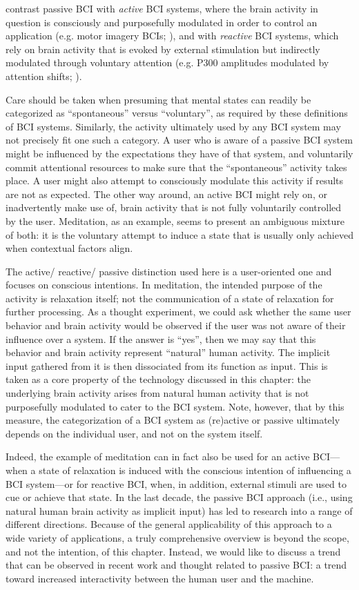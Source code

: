  contrast passive BCI with \emph{active} BCI systems, where the brain activity in question is consciously and purposefully modulated in order to control an application (e.g. motor imagery BCIs; ), and with \emph{reactive} BCI systems, which rely on brain activity that is evoked by external stimulation but indirectly modulated through voluntary attention (e.g. P300 amplitudes modulated by attention shifts; ).

Care should be taken when presuming that mental states can readily be categorized as ``spontaneous'' versus ``voluntary'', as required by these definitions of BCI systems. Similarly, the activity ultimately used by any BCI system may not precisely fit one such a category. A user who is aware of a passive BCI system might be influenced by the expectations they have of that system, and voluntarily commit attentional resources to make sure that the ``spontaneous'' activity takes place. A user might also attempt to consciously modulate this activity if results are not as expected. The other way around, an active BCI might rely on, or inadvertently make use of, brain activity that is not fully voluntarily controlled by the user. Meditation, as an example, seems to present an ambiguous mixture of both: it is the voluntary attempt to induce a state that is usually only achieved when contextual factors align.

The active/ reactive/ passive distinction used here is a user-oriented one and focuses on conscious intentions. In meditation, the intended purpose of the activity is relaxation itself; not the communication of a state of relaxation for further processing. As a thought experiment, we could ask whether the same user behavior and brain activity would be observed if the user was not aware of their influence over a system. If the answer is ``yes'', then we may say that this behavior and brain activity represent ``natural'' human activity. The implicit input gathered from it is then dissociated from its function as input. This is taken as a core property of the technology discussed in this chapter: the underlying brain activity arises from natural human activity that is not purposefully modulated to cater to the BCI system. Note, however, that by this measure, the categorization of a BCI system as (re)active or passive ultimately depends on the individual user, and not on the system itself.

Indeed, the example of meditation can in fact also be used for an active BCI---when a state of relaxation is induced with the conscious intention of influencing a BCI system---or for reactive BCI, when, in addition, external stimuli are used to cue or achieve that state.
In the last decade, the passive BCI approach (i.e., using natural human brain activity as implicit input) has led to research into a range of different directions. Because of the general applicability of this approach to a wide variety of applications, a truly comprehensive overview is beyond the scope, and not the intention, of this chapter. Instead, we would like to discuss a trend that can be observed in recent work and thought related to passive BCI: a trend toward increased interactivity between the human user and the machine.

